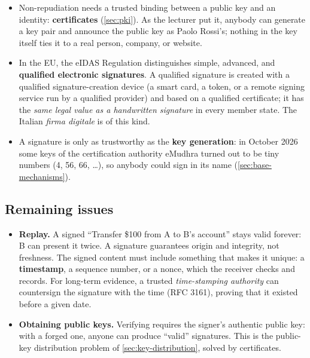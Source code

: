 \begin{itemize}
    \item Non-repudiation needs a trusted binding between a public key and an identity: \textbf{certificates} (\cref{sec:pki}). As the lecturer put it, anybody can generate a key pair and announce the public key as Paolo Rossi's; nothing in the key itself ties it to a real person, company, or website.
    \item In the EU, the eIDAS Regulation distinguishes simple, advanced, and \textbf{qualified electronic signatures}. A qualified signature is created with a qualified signature-creation device (a smart card, a token, or a remote signing service run by a qualified provider) and based on a qualified certificate; it has the \emph{same legal value as a handwritten signature} in every member state. The Italian \emph{firma digitale} is of this kind.
    \item A signature is only as trustworthy as the \textbf{key generation}: in October 2026 some keys of the certification authority eMudhra turned out to be tiny numbers (4, 56, 66, \dots), so anybody could sign in its name (\cref{sec:base-mechanisms}).
\end{itemize}

\subsection{Remaining issues}

\begin{itemize}
    \item \textbf{Replay.} A signed \enquote{Transfer \$100 from A to B's account} stays valid forever: B can present it twice. A signature guarantees origin and integrity, not freshness. The signed content must include something that makes it unique: a \textbf{timestamp}, a sequence number, or a nonce, which the receiver checks and records. For long-term evidence, a trusted \emph{time-stamping authority} can countersign the signature with the time (RFC 3161), proving that it existed before a given date.
    \item \textbf{Obtaining public keys.} Verifying requires the signer's authentic public key: with a forged one, anyone can produce \enquote{valid} signatures. This is the public-key distribution problem of \cref{sec:key-distribution}, solved by certificates.
\end{itemize}

